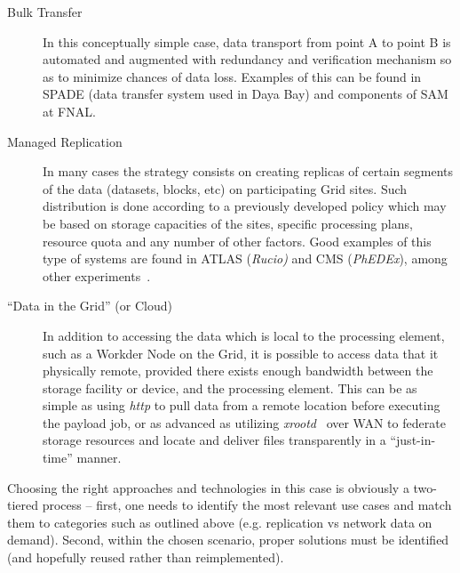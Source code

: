 \begin{description}
\item[Bulk Transfer] In this conceptually simple case, data transport from point A to point B is automated and augmented
with redundancy and verification mechanism so as to minimize chances of data loss. Examples of this can be found in SPADE
(data transfer system used in Daya Bay) and components of SAM at FNAL.

\item[Managed Replication] In many cases the strategy consists on creating replicas of certain segments of the data (datasets, blocks, etc)
on participating Grid sites. Such distribution is done according to a previously developed policy which may be based on storage capacities of 
the sites, specific processing plans, resource quota and any number of other factors. Good examples of this type of systems are found in
ATLAS (\textit{Rucio)} and CMS (\textit{PhEDEx}), among other experiments~\cite{rucio_chep13,phedex_chep09}.

\item[``Data in the Grid'' (or Cloud)] In addition to accessing the data which is local to the processing element, such as a Workder Node
on the Grid, it is possible to access data that it physically remote, provided there exists enough bandwidth between the storage
facility or device, and the processing element. This can be as simple as using \textit{http} to pull data from a remote location before
executing the payload job, or as advanced as utilizing \textit{xrootd}~\cite{xrootd,xrootd_web} over WAN to federate storage resources and locate and
deliver files transparently in a ``just-in-time'' manner.

\end{description}


 Choosing the right approaches and technologies in this case is obviously a two-tiered process -- first, one needs to identify the most
 relevant use cases and match them to categories such as outlined above (e.g. replication vs network data on demand). Second, within
 the chosen scenario, proper solutions must be identified (and hopefully reused rather than reimplemented).
   





